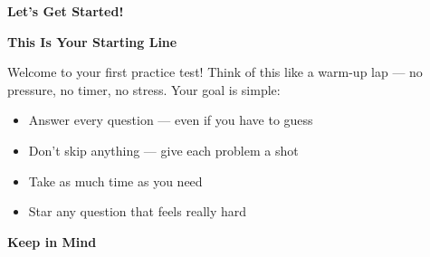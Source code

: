 \clearpage
\thispagestyle{empty}
{\sffamily

\begin{center}
{\fontsize{22}{26}\selectfont\bfseries\color{funBlue} \faPlayCircle\hspace{3mm}Let's Get Started!\hspace{3mm}\faPlayCircle}

\vspace{2mm}
{\color{funGray}\hrulefill}
\end{center}

\vspace{3mm}

\begin{tcolorbox}[
    enhanced,
    colback=funBlueLight,
    colframe=funBlue!50,
    arc=10pt,
    boxrule=1.5pt,
    left=6mm, right=6mm, top=5mm, bottom=5mm,
]
{\large\bfseries\color{funBlueDark} \faMapMarkerAlt\hspace{2mm}This Is Your Starting Line}

\vspace{2mm}

Welcome to your first practice test! Think of this like a warm-up lap — no pressure, no timer, no stress. Your goal is simple:

\vspace{3mm}

\begin{itemize}[leftmargin=6mm, itemsep=3pt]
    \item[\textcolor{funBlue}{\faPencilAlt}] Answer every question — even if you have to guess
    \item[\textcolor{funBlue}{\faPencilAlt}] Don't skip anything — give each problem a shot
    \item[\textcolor{funBlue}{\faPencilAlt}] Take as much time as you need
    \item[\textcolor{funBlue}{\faPencilAlt}] Star any question that feels really hard
\end{itemize}
\end{tcolorbox}

\vspace{3mm}

\begin{tcolorbox}[
    enhanced,
    colback=funYellowLight,
    colframe=funYellow!60,
    arc=10pt,
    boxrule=1pt,
    left=6mm, right=6mm, top=4mm, bottom=4mm,
]
{\bfseries\color{funYellowDark} \faLightbulb\hspace{2mm}Keep in Mind}


\end{tcolorbox}}

